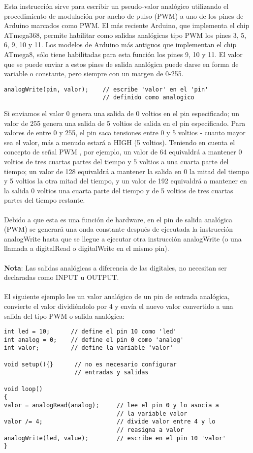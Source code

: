 Esta instrucción sirve para escribir un pseudo-valor analógico utilizando el procedimiento de modulación por ancho de pulso (PWM) a uno de los pines de Arduino marcados como PWM. El más reciente Arduino, que implementa el chip ATmega368, permite habilitar como salidas analógicas tipo PWM los pines 3, 5, 6, 9, 10 y 11. Los modelos de Arduino más antiguos que implementan el chip ATmega8, sólo tiene habilitadas para esta función los pines 9, 10 y 11. El valor que se puede enviar a estos pines de salida analógica puede darse en forma de variable o constante, pero siempre con un margen de 0-255.
\begin{lstlisting}
analogWrite(pin, valor);    // escribe 'valor' en el 'pin'
                            // definido como analogico
\end{lstlisting}
Si enviamos el valor 0 genera una salida de 0 voltios en el pin especificado; un valor de 255 genera una salida de 5 voltios de salida en el pin especificado. Para valores de entre 0 y 255, el pin saca tensiones entre 0 y 5 voltios - cuanto mayor sea el valor, más a menudo estará a HIGH (5 voltios). Teniendo en cuenta el concepto de señal PWM , por ejemplo, un valor de 64 equivaldrá a mantener 0 voltios de tres cuartas partes del tiempo y 5 voltios a una cuarta parte del tiempo; un valor de 128 equivaldrá a mantener la salida en 0 la mitad del tiempo y 5 voltios la otra mitad del tiempo, y un valor de 192 equivaldrá a mantener en la salida 0 voltios una cuarta parte del tiempo y de 5 voltios de tres cuartas partes del tiempo restante.\\\\
Debido a que esta es una función de hardware, en el pin de salida analógica (PWM) se generará una onda constante después de ejecutada la instrucción analogWrite hasta que se llegue a ejecutar otra instrucción analogWrite (o una llamada a digitalRead o digitalWrite en el mismo pin).\\\\
\textbf{Nota}: Las salidas analógicas a diferencia de las digitales, no necesitan ser declaradas como INPUT u OUTPUT.\\\\
El siguiente ejemplo lee un valor analógico de un pin de entrada analógica, convierte el valor dividiéndolo por 4 y envía el nuevo valor convertido a una salida del tipo PWM o salida analógica:
\begin{lstlisting}
int led = 10;      // define el pin 10 como 'led'
int analog = 0;    // define el pin 0 como 'analog'
int valor;         // define la variable 'valor'

void setup(){}      // no es necesario configurar
                    // entradas y salidas

void loop()
{
valor = analogRead(analog);     // lee el pin 0 y lo asocia a
                                // la variable valor
valor /= 4;                     // divide valor entre 4 y lo
                                // reasigna a valor
analogWrite(led, value);        // escribe en el pin 10 'valor'
}
\end{lstlisting}
